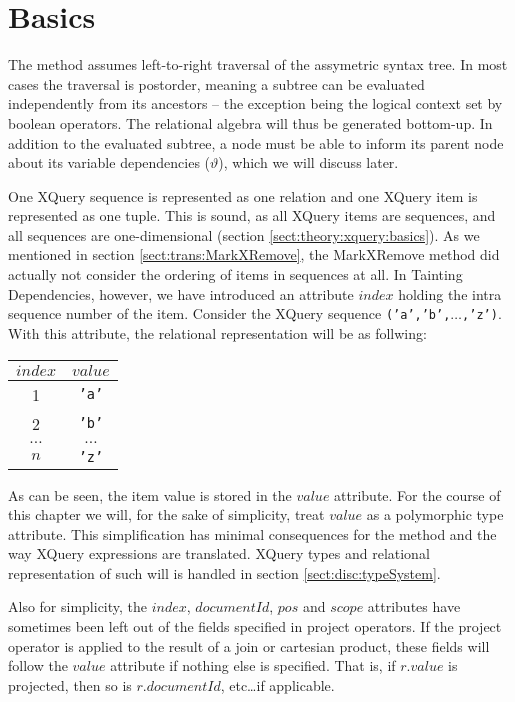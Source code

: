 \section{Basics}
\label{sect:trans:TD:basics}
The method assumes left-to-right traversal of the assymetric syntax tree. In most cases the traversal is
postorder, meaning a subtree can be evaluated independently from its ancestors -- the exception being the logical
context set by boolean operators. The relational algebra will thus be generated bottom-up. In addition to the
evaluated subtree, a node must be able to inform its parent node about its variable dependencies ($\vartheta$),
which we will discuss later.

One XQuery sequence is represented as one relation and one XQuery item is represented as one tuple. This is sound,
as all XQuery items are sequences, and all sequences are one-dimensional (section
\ref{sect:theory:xquery:basics}). As we mentioned in section \ref{sect:trans:MarkXRemove}, the MarkXRemove method
did actually not consider the ordering of items in sequences at all. In Tainting Dependencies, however, we have
introduced an attribute $index$ holding the intra sequence number of the item. Consider the XQuery sequence
\texttt{('a','b',}$\ldots$\texttt{,'z')}. With this attribute, the relational representation will be as follwing:

\begin{center}
\begin{tabular}{|c|c|} \hline
$index$ & $value$ \\\hline
1		& \texttt{'a'} \\\hline
2		& \texttt{'b'} \\\hline
$\ldots$& $\ldots$ \\\hline
$n$		& \texttt{'z'} \\\hline
\end{tabular}
\end{center}


As can be seen, the item value is stored in the $value$ attribute. For the course of this chapter we will, for the
sake of simplicity, treat $value$ as a polymorphic type attribute. This simplification has minimal consequences
for the method and the way XQuery expressions are translated. XQuery types and relational representation of such
will is handled in section \ref{sect:disc:typeSystem}.

Also for simplicity, the $index$, $documentId$, $pos$ and $scope$ attributes have sometimes been left out of the
fields specified in \textsf{project} operators. If the \textsf{project} operator is applied to the result of a
join or cartesian product, these fields will follow the $value$ attribute if nothing else is specified. That is, if
$r.value$ is projected, then so is $r.documentId$, etc\ldots if applicable.

